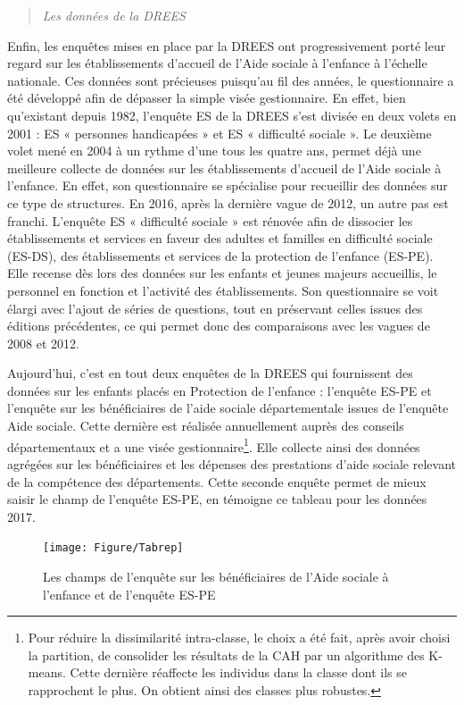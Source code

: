 \documentclass[
  12,
  a4paper,
]{report}
\begin{document}
\begin{quote}
\emph{Les données de la DREES}
\end{quote}

Enfin, les enquêtes mises en place par la DREES ont progressivement
porté leur regard sur les établissements d'accueil de l'Aide sociale à
l'enfance à l'échelle nationale. Ces données sont précieuses puisqu'au
fil des années, le questionnaire a été développé afin de dépasser la
simple visée gestionnaire. En effet, bien qu'existant depuis 1982,
l'enquête ES de la DREES s'est divisée en deux volets en 2001 : ES «
personnes handicapées » et ES « difficulté sociale ». Le deuxième volet
mené en 2004 à un rythme d'une tous les quatre ans, permet déjà une
meilleure collecte de données sur les établissements d'accueil de l'Aide
sociale à l'enfance. En effet, son questionnaire se spécialise pour
recueillir des données sur ce type de structures. En 2016, après la
dernière vague de 2012, un autre pas est franchi. L'enquête ES «
difficulté sociale » est rénovée afin de dissocier les établissements et
services en faveur des adultes et familles en difficulté sociale
(ES-DS), des établissements et services de la protection de l'enfance
(ES-PE). Elle recense dès lors des données sur les enfants et jeunes
majeurs accueillis, le personnel en fonction et l'activité des
établissements. Son questionnaire se voit élargi avec l'ajout de séries
de questions, tout en préservant celles issues des éditions précédentes,
ce qui permet donc des comparaisons avec les vagues de 2008 et 2012.

Aujourd'hui, c'est en tout deux enquêtes de la DREES qui fournissent des
données sur les enfants placés en Protection de l'enfance : l'enquête
ES-PE et l'enquête sur les bénéficiaires de l'aide sociale
départementale issues de l'enquête Aide sociale. Cette dernière est
réalisée annuellement auprès des conseils départementaux et a une visée
gestionnaire\footnote{Pour réduire la dissimilarité intra-classe, le
  choix a été fait, après avoir choisi la partition, de consolider les
  résultats de la CAH par un algorithme des K-means. Cette dernière
  réaffecte les individus dans la classe dont ils se rapprochent le
  plus. On obtient ainsi des classes plus robustes.}. Elle collecte
ainsi des données agrégées sur les bénéficiaires et les dépenses des
prestations d'aide sociale relevant de la compétence des départements.
Cette seconde enquête permet de mieux saisir le champ de l'enquête
ES-PE, en témoigne ce tableau pour les données 2017.

\begin{figure}

{\centering \texttt{[image: Figure/Tabrep]} 

}

\caption{Les champs de l'enquête sur les bénéficiaires de l'Aide sociale à l'enfance et de l'enquête ES-PE}\label{fig:unnamed-chunk-10}
\end{figure}
\end{document}
